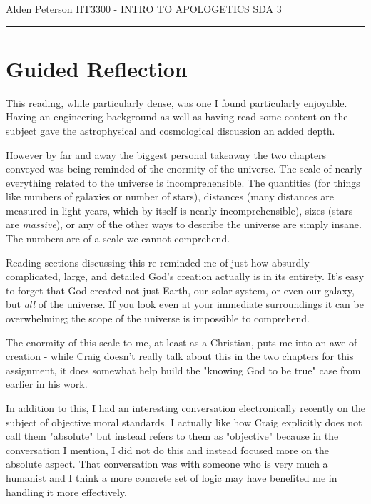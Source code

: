 \documentclass[12pt]{turabian-researchpaper}
\begin{document}
\begin{singlespace}
\noindent Alden Peterson \newline
\noindent HT3300 - INTRO TO APOLOGETICS \newline
\noindent SDA 3 \newline
\noindent\rule{4cm}{0.4pt}
\end{singlespace}

\section{Guided Reflection}

This reading, while particularly dense, was one I found particularly enjoyable. Having an engineering background as well as having read some content on the subject gave the astrophysical and cosmological discussion an added depth.

However by far and away the biggest personal takeaway the two chapters conveyed was being reminded of the enormity of the universe. The scale of nearly everything related to the universe is incomprehensible. The quantities (for things like numbers of galaxies or number of stars), distances (many distances are measured in light years, which by itself is nearly incomprehensible), sizes (stars are \textit{massive}), or any of the other ways to describe the universe are simply insane. The numbers are of a scale we cannot comprehend.

Reading sections discussing this re-reminded me of just how absurdly complicated, large, and detailed God's creation actually is in its entirety. It's easy to forget that God created not just Earth, our solar system, or even our galaxy, but \textit{all} of the universe. If you look even at your immediate surroundings it can be overwhelming; the scope of the universe is impossible to comprehend.

The enormity of this scale to me, at least as a Christian, puts me into an awe of creation - while Craig doesn't really talk about this in the two chapters for this assignment, it does somewhat help build the "knowing God to be true" case from earlier in his work.

In addition to this, I had an interesting conversation electronically recently on the subject of objective moral standards. I actually like how Craig explicitly does not call them "absolute" but instead refers to them as "objective" because in the conversation I mention, I did not do this and instead focused more on the absolute aspect.\autocite[pg.194]{craig2008reasonable} That conversation was with someone who is very much a humanist and I think a more concrete set of logic may have benefited me in handling it more effectively.
\end{document}

